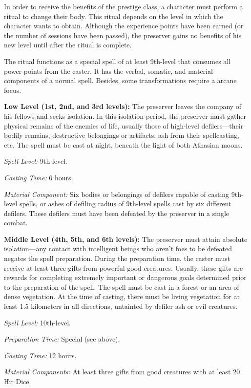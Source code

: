 {In order to receive the benefits of the prestige class, a character must perform a ritual to change their body. This ritual depends on the level in which the character wants to obtain. Although the experience points have been earned (or the number of sessions have been passed), the preserver gains no benefits of his new level until after the ritual is complete.

The ritual functions as a special spell of at least 9th-level that consumes all power points from the caster. It has the verbal, somatic, and material components of a normal spell. Besides, some transformations require a arcane focus.

\textbf{Low Level (1st, 2nd, and 3rd levels):} The preserver leaves the company of his fellows and seeks isolation. In this isolation period, the preserver must gather physical remains of the enemies of life, usually those of high-level defilers---their bodily remains, destructive belongings or artifacts, ash from their spellcasting, etc. The spell must be cast at night, beneath the light of both Athasian moons.

\textit{Spell Level:} 9th-level.

\textit{Casting Time:} 6 hours.

\textit{Material Component:} Six bodies or belongings of defilers capable of casting 9th-level spells, or ashes of defiling radius of 9th-level spells cast by six different defilers. These defilers must have been defeated by the preserver in a single combat.

\textbf{Middle Level (4th, 5th, and 6th levels):} The preserver must attain absolute isolation---any contact with intelligent beings who aren't foes to be defeated negates the spell preparation. During the preparation time, the caster must receive at least three gifts from powerful good creatures. Usually, these gifts are rewards for completing extremely important or dangerous goals determined prior to the preparation of the spell. The spell must be cast in a forest or an area of dense vegetation. At the time of casting, there must be living vegetation for at least 1.5 kilometers in all directions, untainted by defiler ash or evil creatures.

\textit{Spell Level:} 10th-level.

\textit{Preparation Time:} Special (see above).

\textit{Casting Time:} 12 hours.

\textit{Material Components:} At least three gifts from good creatures with at least 20 Hit Dice.

}

